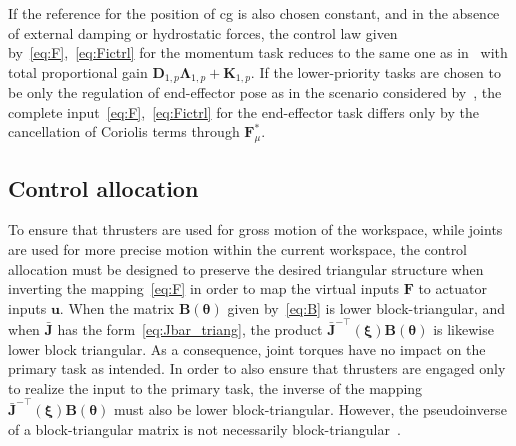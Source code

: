 \documentclass[../main.tex]{subfiles}
\begin{document}

\begin{remark}
    If the reference for the position of \gls{cg} is also chosen constant, and in the absence of external damping or hydrostatic forces, the control law given by~\eqref{eq:F},~\eqref{eq:Fictrl} for the momentum task reduces to the same one as in~\citep{Giordano2018} with total proportional gain $\bm{D}_{1,p} \bm{\Lambda}_{1,p} + \bm{K}_{1,p}$. If the lower-priority tasks are chosen to be only the regulation of end-effector pose as in the scenario considered by~\cite{Giordano2018}, the complete input~\eqref{eq:F},~\eqref{eq:Fictrl} for the end-effector task differs only by the cancellation of Coriolis terms through $\bm{F}^*_{\mu}$.%
\end{remark}
%

\subsection{Control allocation}\label{sec:alloc}
To ensure that thrusters are used for gross motion of the workspace, while joints are used for more precise motion within the current workspace, the control allocation must be designed to preserve the desired triangular structure when inverting the mapping~\eqref{eq:F} in order to map the virtual inputs $\bm{F}$ to actuator inputs $\bm{u}$. %
When the matrix $\bm{B}(\bm{\theta})$ given by~\eqref{eq:B} is lower block-triangular, and when $\bar{\bm{J}}$ has the form~\eqref{eq:Jbar_triang}, the product $\bar{\bm{J}}^{-\top}(\bm{\xi}) \bm{B} (\bm{\theta} )$ is likewise lower block triangular. As a consequence, joint torques have no impact on the primary task as intended. In order to also ensure that thrusters are engaged only to realize the input to the primary task, the inverse of the mapping $\bar{\bm{J}}^{-\top}(\bm{\xi}) \bm{B} (\bm{\theta} )$ must also be lower block-triangular. However, the pseudoinverse of a block-triangular matrix is not necessarily block-triangular~\citep{Meyer1970}.
\end{document}
